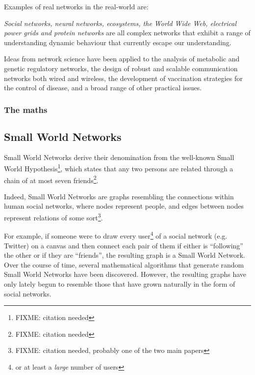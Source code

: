 \documentclass[a4paper,11pt,titlepage]{article}
\begin{document}
Examples of real networks in the real-world are:

\emph{Social networks, neural networks, ecosystems, the World Wide
  Web, electrical power grids and protein networks} are all complex
networks that exhibit a range of understanding dynamic behaviour that
currently escape our understanding. \cite{oconn11}

Ideas from network science have been applied to the analysis of
metabolic and genetic regulatory networks, the design of robust and
scalable communication networks both wired and wireless, the
development of vaccination strategies for the control of disease, and
a broad range of other practical issues. \cite{complexNets}

\subsubsection{The maths}





\subsection{Small World Networks}

Small World Networks derive their denomination from the well-known
Small World Hypothesis\footnote{FIXME: citation needed}, which states
that any two persons are related through a chain of at most seven
friends\footnote{FIXME: citation needed}.

Indeed, Small World Networks are graphs resembling the connections
within human social networks, where nodes represent people, and edges
between nodes represent relations of some sort\footnote{FIXME:
  citation needed, probably one of the two main papers}.

For example, if someone were to draw every user\footnote{or at least a
  \emph{large} number of users} of a social network (e.g. Twitter) on
a canvas and then connect each pair of them if either is ``following''
the other or if they are ``friends'', the resulting graph is a Small
World Network. Over the course of time, several mathematical
algorithms that generate random Small World Networks have been
discovered. However, the resulting graphs have only lately begun to
resemble those that have grown naturally in the form of social
networks.

\end{document}
